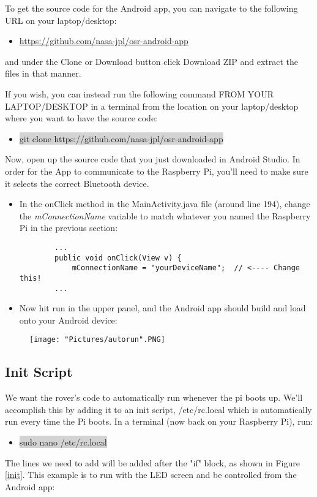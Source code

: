 \documentclass[12pt]{article}
\begin{document}
\bigskip

\noindent To get the source code for the Android app, you can navigate to the following URL on your laptop/desktop:

\begin{itemize}
	\item[] \href{https://github.com/nasa-jpl/osr-android-app}{https://github.com/nasa-jpl/osr-android-app}
\end{itemize}

\noindent and under the Clone or Download button click Download ZIP and extract the files in that manner. 

If you wish, you can instead run the following command FROM YOUR LAPTOP/DESKTOP in a terminal from the location on your laptop/desktop where you want to have the source code:

\begin{itemize}
	\item[] \colorbox{lightgray}{git clone https://github.com/nasa-jpl/osr-android-app}
\end{itemize}

\bigskip

\noindent Now, open up the source code that you just downloaded in Android Studio. In order for the App to communicate to the Raspberry Pi, you'll need to make sure it selects the correct Bluetooth device.

\begin{itemize}
	\item In the onClick method in the MainActivity.java file (around line 194), change the \textit{mConnectionName} variable to match whatever you named the Raspberry Pi in the previous section:
	\begin{lstlisting}
		...
		public void onClick(View v) {
			mConnectionName = "yourDeviceName";  // <---- Change this!
		...
	\end{lstlisting}
	\item Now hit run in the upper panel, and the Android app should build and load onto your Android device:
\end{itemize}

\begin{figure}[H]
 	\centering
	\texttt{[image: "Pictures/autorun".PNG]}
 	\caption{}
	\label{}
\end{figure}


\subsection{Init Script}
We want the rover's code to automatically run whenever the pi boots up. We'll accomplish this by adding it to an init script, /etc/rc.local which is automatically run every time the Pi boots. In a terminal (now back on your Raspberry Pi), run:
\begin{itemize}
	\item[] \colorbox{lightgray}{sudo nano /etc/rc.local}
\end{itemize}
\noindent The lines we need to add will be added after the "if" block, as shown in Figure \ref{init}. This example is to run with the LED screen and be controlled from the Android app:
\end{document}

